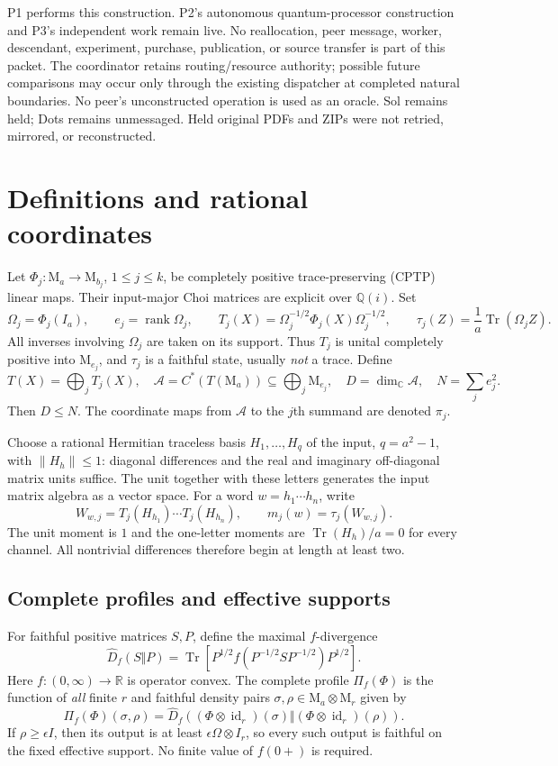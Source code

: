 \documentclass[11pt,a4paper]{article}
\theoremstyle{definition}\newtheorem{definition}[theorem]{Definition}
\newcommand{\Tr}{\operatorname{Tr}}
\newcommand{\id}{\operatorname{id}}
\newcommand{\rank}{\operatorname{rank}}
\newcommand{\Alg}{\mathcal A}
\newcommand{\Q}{\mathbb Q}
\newcommand{\C}{\mathbb C}
\newcommand{\R}{\mathbb R}
\newcommand{\M}{\mathrm M}
\newcommand{\Dhat}{\widehat D}
\newcommand{\norm}[1]{\left\lVert #1\right\rVert}
\begin{document}
P1 performs this construction. P2's autonomous quantum-processor construction and P3's independent work remain live. No reallocation, peer message, worker, descendant, experiment, purchase, publication, or source transfer is part of this packet. The coordinator retains routing/resource authority; possible future comparisons may occur only through the existing dispatcher at completed natural boundaries. No peer's unconstructed operation is used as an oracle. Sol remains held; Dots remains unmessaged. Held original PDFs and ZIPs were not retried, mirrored, or reconstructed.

\section{Definitions and rational coordinates}\label{sec:setup}

Let $\Phi_j:\M_a\to\M_{b_j}$, $1\le j\le k$, be completely positive trace-preserving (CPTP) linear maps. Their input-major Choi matrices are explicit over $\Q(i)$. Set
\[
 \Omega_j=\Phi_j(I_a),\qquad e_j=\rank\Omega_j,
 \qquad T_j(X)=\Omega_j^{-1/2}\Phi_j(X)\Omega_j^{-1/2},
 \qquad \tau_j(Z)=\frac1a\Tr(\Omega_j Z).
\]
All inverses involving $\Omega_j$ are taken on its support. Thus $T_j$ is unital completely positive into $\M_{e_j}$, and $\tau_j$ is a faithful state, usually \emph{not} a trace. Define
\[
 T(X)=\bigoplus_j T_j(X),\quad
 \Alg=C^*(T(\M_a))\subseteq\bigoplus_j\M_{e_j},\quad
 D=\dim_{\C}\Alg,\quad N=\sum_j e_j^2.
\]
Then $D\le N$. The coordinate maps from $\Alg$ to the $j$th summand are denoted $\pi_j$.

Choose a rational Hermitian traceless basis $H_1,\ldots,H_q$ of the input, $q=a^2-1$, with $\norm{H_h}\le1$: diagonal differences and the real and imaginary off-diagonal matrix units suffice. The unit together with these letters generates the input matrix algebra as a vector space. For a word $w=h_1\cdots h_n$, write
\[
 W_{w,j}=T_j(H_{h_1})\cdots T_j(H_{h_n}),\qquad
 m_j(w)=\tau_j(W_{w,j}).
\]
The unit moment is $1$ and the one-letter moments are $\Tr(H_h)/a=0$ for every channel. All nontrivial differences therefore begin at length at least two.

\subsection{Complete profiles and effective supports}

For faithful positive matrices $S,P$, define the maximal $f$-divergence
\[
 \Dhat_f(S\Vert P)=\Tr\left[P^{1/2}
 f(P^{-1/2}SP^{-1/2})P^{1/2}\right].
\]
Here $f:(0,\infty)\to\R$ is operator convex. The complete profile $\Pi_f(\Phi)$ is the function of \emph{all} finite $r$ and faithful density pairs $\sigma,\rho\in\M_a\otimes\M_r$ given by
\[
 \Pi_f(\Phi)(\sigma,\rho)=
 \Dhat_f((\Phi\otimes\id_r)(\sigma)\Vert(\Phi\otimes\id_r)(\rho)).
\]
If $\rho\ge\epsilon I$, then its output is at least $\epsilon\Omega\otimes I_r$, so every such output is faithful on the fixed effective support. No finite value of $f(0+)$ is required.
\end{document}
